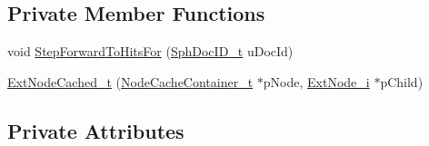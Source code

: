 \subsection*{Private Member Functions}
\begin{DoxyCompactItemize}
\item 
void \hyperlink{classExtNodeCached__t_a7ddc329c384f42d5e170a6ec52eec645}{Step\-Forward\-To\-Hits\-For} (\hyperlink{sphinx_8h_a3176771631c12a9e4897272003e6b447}{Sph\-Doc\-I\-D\-\_\-t} u\-Doc\-Id)
\item 
\hyperlink{classExtNodeCached__t_adbc9ac571aecdbb880def62ec40c8d65}{Ext\-Node\-Cached\-\_\-t} (\hyperlink{classNodeCacheContainer__t}{Node\-Cache\-Container\-\_\-t} $\ast$p\-Node, \hyperlink{classExtNode__i}{Ext\-Node\-\_\-i} $\ast$p\-Child)
\end{DoxyCompactItemize}
\subsection*{Private Attributes}
